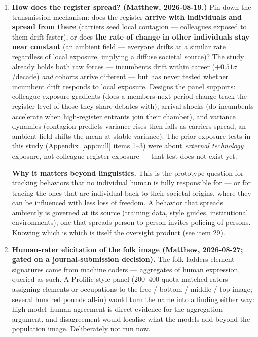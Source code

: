 \begin{enumerate}
  register of LLM-generated speech derived by the same methodology. The
  overlap matrix is the finding: one register with identifier-specific
  weights, or several --- and how much of the human-drone register IS the
  machine register.
\item
  \textbf{How does the register spread? (Matthew, 2026-08-19.)} Pin down the
  transmission mechanism: does the register \textbf{arrive with individuals and
  spread from there} (carriers seed local contagion --- colleagues exposed
  to them drift faster), or does \textbf{the rate of change in other individuals
  stay near constant} (an ambient field --- everyone drifts at a similar
  rate regardless of local exposure, implying a diffuse societal source)?
  The study already holds both raw forces --- incumbents drift within career
  (\(+0.51\sigma\)/decade) \emph{and} cohorts arrive different --- but has never tested
  whether incumbent drift responds to local exposure. Designs the panel
  supports: colleague-exposure gradients (does a member\textquotesingle s next-period
  change track the register level of those they share debates with),
  arrival shocks (do incumbents accelerate when high-register entrants
  join their chamber), and variance dynamics (contagion predicts variance
  rises then falls as carriers spread; an ambient field shifts the mean at
  stable variance). The prior exposure tests in this study (Appendix~\ref{app:null}
  items 1--3) were about \emph{external technology} exposure, not
  colleague-register exposure --- that test does not exist yet.

  \textbf{Why it matters beyond linguistics.} This is the prototype question for
  tracking behaviors that no individual human is fully responsible for --- or
  for tracing the ones that are individual back to their societal origins,
  where they can be influenced with less loss of freedom. A behavior that
  spreads ambiently is governed at its source (training data, style guides,
  institutional environments); one that spreads person-to-person invites
  policing of persons. Knowing which is which is itself the oversight
  product (see item 29).
\item
  \textbf{Human-rater elicitation of the folk image (Matthew, 2026-08-27; gated
  on a journal-submission decision).} The folk ladder\textquotesingle s element
  signatures came from machine coders --- aggregates of human expression,
  queried as such. A Prolific-style panel (200--400 quota-matched raters
  assigning elements or occupations to the free / bottom / middle / top
  image; several hundred pounds all-in) would turn the name into a
  finding either way: high model--human agreement is direct evidence for
  the aggregation argument, and disagreement would localise what the
  models add beyond the population image. Deliberately not run now.
\end{enumerate}


